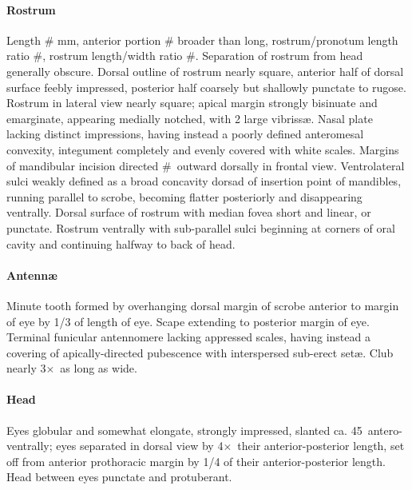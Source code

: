 \documentclass[fleqn,10pt,lineno]{wlpeerj} %
\newcommand{\td}{\textdegree~}
\newcommand{\x}{$\times$~}
\begin{document}
			\paragraph{Rostrum}
				Length \# mm, anterior portion \# broader than long, rostrum/pronotum length ratio \#, rostrum length/width ratio \#.
				Separation of rostrum from head generally obscure. 
				Dorsal outline of rostrum nearly square, anterior half of dorsal surface feebly impressed, posterior half coarsely but shallowly punctate to rugose. 
				Rostrum in lateral view nearly square; apical margin strongly bisinuate and emarginate, appearing medially notched, with 2 large vibriss{\ae}. 
				Nasal plate lacking distinct impressions, having instead a poorly defined anteromesal convexity, integument completely and evenly covered with white scales. 
				Margins of mandibular incision directed \#\td outward dorsally in frontal view. 
				Ventrolateral sulci weakly defined as a broad concavity dorsad of insertion point of mandibles, running parallel to scrobe, becoming flatter posteriorly and disappearing ventrally.
				Dorsal surface of rostrum with median fovea short and linear, or punctate.
				Rostrum ventrally with sub-parallel sulci beginning at corners of oral cavity and continuing halfway to back of head.
			\paragraph{Antenn{\ae}}
				Minute tooth formed by overhanging dorsal margin of scrobe anterior to margin of eye by 1/3 of length of eye.
				Scape extending to posterior margin of eye.
				Terminal funicular antennomere lacking appressed scales, having instead a covering of apically-directed pubescence with interspersed sub-erect set{\ae}.
				Club nearly 3\x as long as wide.
			\paragraph{Head}
				Eyes globular and somewhat elongate, strongly impressed, slanted ca. 45\td antero-ventrally; eyes separated in dorsal view by 4\x their anterior-posterior length, set off from anterior prothoracic margin by 1/4 of their anterior-posterior length. 
				Head between eyes punctate and protuberant.
\end{document}
